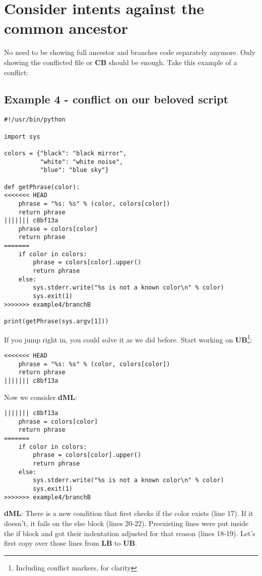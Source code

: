 
\section{Consider intents against the common ancestor}
\label{intent}
No need to be showing full ancestor and branches code separately anymore. Only showing the conflicted file or {\bf CB} should
be enough. Take this example of a conflict:

\subsection{Example 4 - conflict on our beloved script}
\label{example_04}

\begin{lstlisting}[style=python_style, caption={\bf example 4}]
#!/usr/bin/python

import sys

colors = {"black": "black mirror",
          "white": "white noise",
          "blue": "blue sky"}

def getPhrase(color):
<<<<<<< HEAD
    phrase = "%s: %s" % (color, colors[color])
    return phrase
||||||| c8bf13a
    phrase = colors[color]
    return phrase
=======
    if color in colors:
        phrase = colors[color].upper()
        return phrase
    else:
        sys.stderr.write("%s is not a known color\n" % color)
        sys.exit(1)
>>>>>>> example4/branchB

print(getPhrase(sys.argv[1]))
\end{lstlisting}

If you jump right in, you could solve it as we did before. Start working on {\bf UB}\footnote{Including conflict markers, for clarity}:
\begin{lstlisting}[style=python_style, firstnumber=10, caption={\bf example 4} - Step 1 - UB]
<<<<<<< HEAD
    phrase = "%s: %s" % (color, colors[color])
    return phrase
||||||| c8bf13a
\end{lstlisting}

Now we consider {\bf dML}:
\begin{lstlisting}[style=python_style, firstnumber=13, caption={\bf example 4} - Step 2 - dML]
||||||| c8bf13a
    phrase = colors[color]
    return phrase
=======
    if color in colors:
        phrase = colors[color].upper()
        return phrase
    else:
        sys.stderr.write("%s is not a known color\n" % color)
        sys.exit(1)
>>>>>>> example4/branchB
\end{lstlisting}
{\bf dML}: There is a new condition that first checks if the color exists (line 17). If it doesn't, it fails on the else block (lines 20-22).
Preexisting lines were put inside the if block and got their indentation adjusted for that reason (lines 18-19). Let's first copy over
those lines from {\bf LB} to {\bf UB}.

